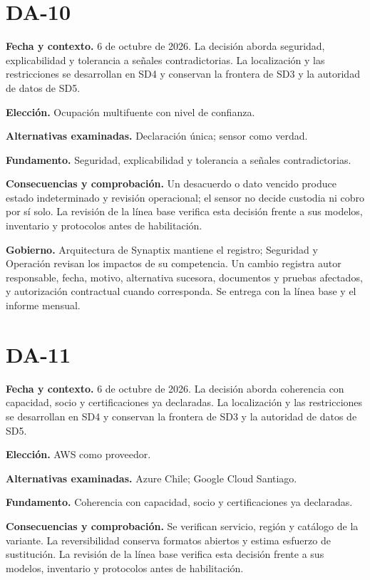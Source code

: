 \documentclass[11pt,letterpaper]{report}
\begin{document}
\section*{DA-10}

\textbf{Fecha y contexto.} 6 de octubre de 2026. La decisión aborda seguridad, explicabilidad y tolerancia a señales contradictorias. La localización y las restricciones se desarrollan en SD4 y conservan la frontera de SD3 y la autoridad de datos de SD5.

\textbf{Elección.} Ocupación multifuente con nivel de confianza.

\textbf{Alternativas examinadas.} Declaración única; sensor como verdad.

\textbf{Fundamento.} Seguridad, explicabilidad y tolerancia a señales contradictorias.

\textbf{Consecuencias y comprobación.} Un desacuerdo o dato vencido produce estado indeterminado y revisión operacional; el sensor no decide custodia ni cobro por sí solo. La revisión de la línea base verifica esta decisión frente a sus modelos, inventario y protocolos antes de habilitación.

\textbf{Gobierno.} Arquitectura de Synaptix mantiene el registro; Seguridad y Operación revisan los impactos de su competencia. Un cambio registra autor responsable, fecha, motivo, alternativa sucesora, documentos y pruebas afectados, y autorización contractual cuando corresponda. Se entrega con la línea base y el informe mensual.

\section*{DA-11}

\textbf{Fecha y contexto.} 6 de octubre de 2026. La decisión aborda coherencia con capacidad, socio y certificaciones ya declaradas. La localización y las restricciones se desarrollan en SD4 y conservan la frontera de SD3 y la autoridad de datos de SD5.

\textbf{Elección.} AWS como proveedor.

\textbf{Alternativas examinadas.} Azure Chile; Google Cloud Santiago.

\textbf{Fundamento.} Coherencia con capacidad, socio y certificaciones ya declaradas.

\textbf{Consecuencias y comprobación.} Se verifican servicio, región y catálogo de la variante. La reversibilidad conserva formatos abiertos y estima esfuerzo de sustitución. La revisión de la línea base verifica esta decisión frente a sus modelos, inventario y protocolos antes de habilitación.
\end{document}
